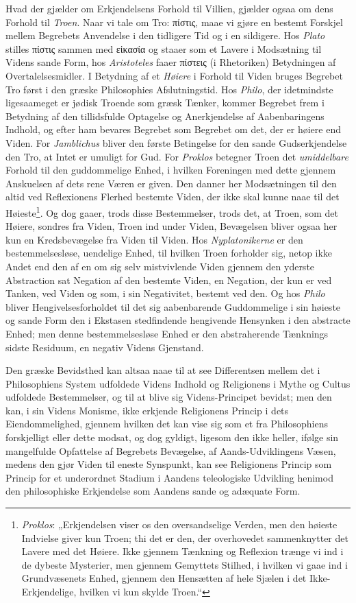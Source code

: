 \documentclass[12pt,a4paper]{book}
\newcommand{\opage}[1]{\marginnote{\footnotesize\textit{[#1]}}}
\begin{document}
Hvad der gjælder om Erkjendelsens Forhold til Villien, gjælder ogsaa
om dens Forhold til \emph{Troen}. Naar vi tale om Tro: πίστις, maae vi gjøre en
bestemt Forskjel mellem Begrebets Anvendelse i den tidligere Tid og i
en sildigere. Hos \emph{Plato} stilles πίστις sammen med εἰκασία og staaer som et
Lavere i Modsætning til Videns sande Form, hos \emph{Aristoteles} faaer
πίστεις (i Rhetoriken) Betydningen af
Overtalelsesmidler. I Betydning af et \emph{Høiere} i Forhold til Viden
bruges Begrebet Tro først i den græske Philosophies Afslutningstid.
Hos \emph{Philo}, der idetmindste ligesaameget er jødisk Troende som græsk
Tænker, kommer Begrebet frem i Betydning af den tillidsfulde Optagelse
og Anerkjendelse af Aabenbaringens Indhold, og efter ham bevares
Begrebet som Begrebet om det, der er høiere end Viden. For \emph{Jamblichus} bliver den første Betingelse for den sande Gudserkjendelse den Tro, at
Intet er umuligt for Gud. For \emph{Proklos} betegner Troen det \emph{umiddelbare} Forhold til den guddommelige Enhed, i hvilken Foreningen med dette
gjennem Anskuelsen af dets rene Væren er given. Den danner her
Modsætningen til den altid ved Reflexionens Flerhed bestemte Viden, der
ikke skal kunne naae til det Høieste\footnote{\emph{Proklos}: „Erkjendelsen viser os
den oversandselige Verden, men den høieste Indvielse giver kun Troen; thi det
er den, der overhovedet sammenknytter det Lavere med det Høiere. Ikke gjennem
Tænkning og Reflexion trænge vi ind i de dybeste Mysterier, men gjennem
Gemyttets Stilhed, i hvilken vi gaae ind i Grundvæsenets Enhed, gjennem den
Hensætten af hele Sjælen i det Ikke-Erkjendelige, hvilken vi kun skylde Troen.“}. Og dog gaaer, trods disse
\opage{14}Bestemmelser, trods det, at Troen, som det Høiere, sondres fra Viden,
Troen ind under Viden, Bevægelsen bliver ogsaa her kun en
Kredsbevægelse fra Viden til Viden. Hos \emph{Nyplatonikerne} er den
bestemmelsesløse, uendelige Enhed, til hvilken Troen forholder sig,
netop ikke Andet end den af en om sig selv mistvivlende Viden gjennem
den yderste Abstraction sat Negation af den bestemte Viden, en
Negation, der kun er ved Tanken, ved Viden og som, i sin Negativitet,
bestemt ved den. Og hos \emph{Philo} bliver Hengivelsesforholdet til det sig
aabenbarende Guddommelige i sin høieste og sande Form den i Ekstasen
stedfindende hengivende Hensynken i den abstracte Enhed; men denne
bestemmelsesløse Enhed er den abstraherende Tænknings sidste Residuum,
en negativ Videns Gjenstand.

Den græske Bevidsthed kan altsaa naae til at see Differentsen mellem
det i Philosophiens System udfoldede Videns Indhold og Religionens i
Mythe og Cultus udfoldede Bestemmelser, og til at blive sig
Videns-Principet bevidst; men den kan, i sin Videns Monisme, ikke
erkjende Religionens Princip i dets Eiendommelighed, gjennem hvilken
det kan vise sig som et fra Philosophiens forskjelligt eller dette
modsat, og dog gyldigt, ligesom den ikke heller, ifølge sin
mangelfulde Opfattelse af Begrebets Bevægelse, af Aands-Udviklingens
Væsen, medens den gjør Viden til eneste Synspunkt, kan see Religionens
Princip som Princip for et underordnet Stadium i Aandens teleologiske
Udvikling henimod den philosophiske Erkjendelse som Aandens sande og
adæquate Form.
\end{document}
